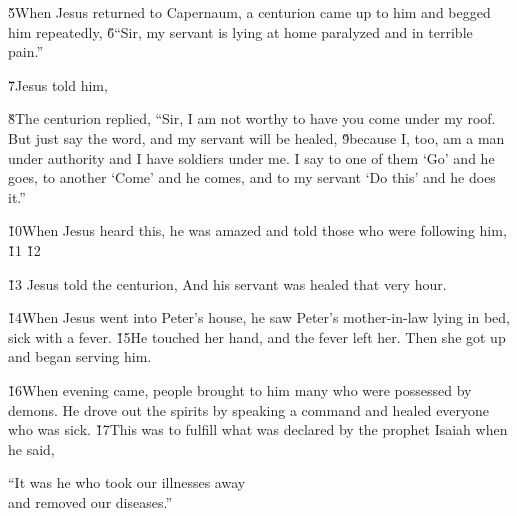 \v{5}When Jesus returned to Capernaum, a centurion came up to him and begged him repeatedly, \v{6}``Sir, my servant is lying at home paralyzed and in terrible pain.''

\v{7}Jesus told him, 

\v{8}The centurion replied, ``Sir, I am not worthy to have you come under my roof. But just say the word, and my servant will be healed, \v{9}because I, too, am a man under authority and I have soldiers under me. I say to one of them `Go' and he goes, to another `Come' and he comes, and to my servant `Do this' and he does it.''

\v{10}When Jesus heard this, he was amazed and told those who were following him,  \v{11} \v{12}

\v{13} Jesus told the centurion,  And his servant was healed that very hour.

\v{14}When Jesus went into Peter's house, he saw Peter's mother-in-law lying in bed, sick with a fever. \v{15}He touched her hand, and the fever left her. Then she got up and began serving him.

\v{16}When evening came, people brought to him many who were possessed by demons. He drove out the spirits by speaking a command and healed everyone who was sick. \v{17}This was to fulfill what was declared by the prophet Isaiah when he said,

\begin{poetry}
\poeml ``It was he who took our illnesses away \\
\poemll    and removed our diseases.''
\end{poetry}


